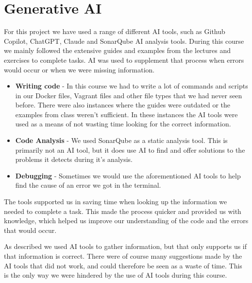 \section{Generative AI}
For this project we have used a range of different AI tools, such as Github Copilot, ChatGPT, Claude and SonarQube AI analysis tools. During this course we mainly followed the extensive guides and examples from the lectures and exercises to complete tasks. AI was used to supplement that process when errors would occur or when we were missing information. 

\begin{itemize}

    \item \textbf{Writing code} - In this course we had to write a lot of commands and scripts in our Docker files, Vagrant files and other file types that we had never seen before. There were also instances where the guides were outdated or the examples from class weren't sufficient. In these instances the AI tools were used as a means of not wasting time looking for the correct information. 

    \item \textbf{Code Analysis} - We used SonarQube as a static analysis tool. This is primarily not an AI tool, but it does use AI to find and offer solutions to the problems it detects during it's analysis.

    \item \textbf{Debugging} - Sometimes we would use the aforementioned AI tools to help find the cause of an error we got in the terminal.

\end{itemize}

The tools supported us in saving time when looking up the information we needed to complete a task. This made the process quicker and provided us with knowledge, which helped us improve our understanding of the code and the errors that would occur. 

As described we used AI tools to gather information, but that only supports us if that information is correct. There were of course many suggestions made by the AI tools that did not work, and could therefore be seen as a waste of time. This is the only way we were hindered by the use of AI tools during this course.

